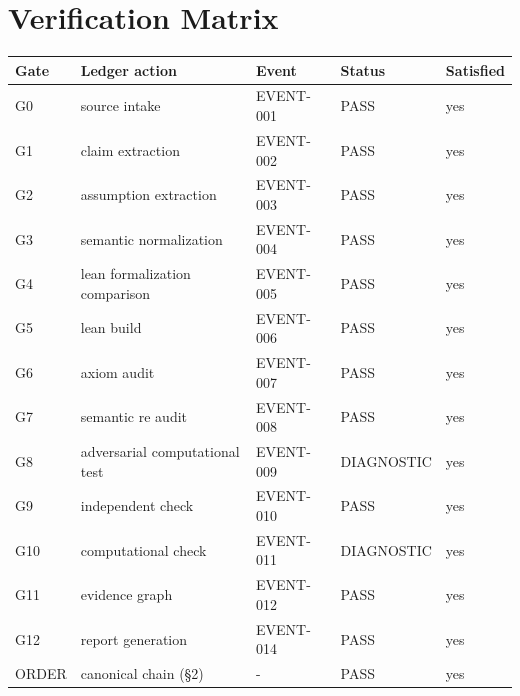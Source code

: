 \documentclass[11pt]{article}
\begin{document}
\section{Verification Matrix}
\begin{longtable}{lllll}
\toprule Gate & Ledger action & Event & Status & Satisfied \\ \midrule \endhead
G0 & source intake & EVENT-001 & PASS & yes \\
G1 & claim extraction & EVENT-002 & PASS & yes \\
G2 & assumption extraction & EVENT-003 & PASS & yes \\
G3 & semantic normalization & EVENT-004 & PASS & yes \\
G4 & lean formalization comparison & EVENT-005 & PASS & yes \\
G5 & lean build & EVENT-006 & PASS & yes \\
G6 & axiom audit & EVENT-007 & PASS & yes \\
G7 & semantic re audit & EVENT-008 & PASS & yes \\
G8 & adversarial computational test & EVENT-009 & DIAGNOSTIC & yes \\
G9 & independent check & EVENT-010 & PASS & yes \\
G10 & computational check & EVENT-011 & DIAGNOSTIC & yes \\
G11 & evidence graph & EVENT-012 & PASS & yes \\
G12 & report generation & EVENT-014 & PASS & yes \\
ORDER & canonical chain (\S{}2) & - & PASS & yes \\
\bottomrule
\end{longtable}
\end{document}
